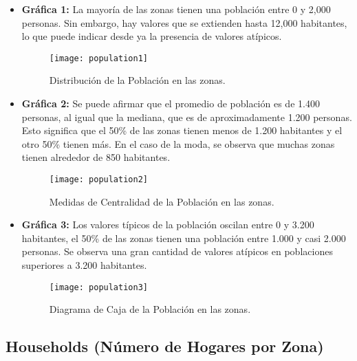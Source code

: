 \documentclass[a4paper, 10pt]{article}
\begin{document}
\begin{itemize}
    \item \textbf{Gráfica 1:} La mayoría de las zonas tienen una población entre 0 y 2,000 personas. Sin embargo, hay valores que se extienden hasta 12,000 habitantes, lo que puede indicar desde ya la presencia de valores atípicos.
    \begin{figure}[H]
        \centering
        \texttt{[image: population1]}
        \caption{Distribución de la Población en las zonas.}
    \end{figure}

    \item \textbf{Gráfica 2:} Se puede afirmar que el promedio de población es de 1.400 personas, al igual que la mediana, que es de aproximadamente 1.200 personas. Esto significa que el 50\% de las zonas tienen menos de 1.200 habitantes y el otro 50\% tienen más. En el caso de la moda, se observa que muchas zonas tienen alrededor de 850 habitantes.
    \begin{figure}[H]
        \centering
        \texttt{[image: population2]}
        \caption{Medidas de Centralidad de la Población en las zonas.}
    \end{figure}

    \item \textbf{Gráfica 3:} Los valores típicos de la población oscilan entre 0 y 3.200 habitantes, el 50\% de las zonas tienen una población entre 1.000 y casi 2.000 personas. Se observa una gran cantidad de valores atípicos en poblaciones superiores a 3.200 habitantes.
    \begin{figure}[H]
        \centering
        \texttt{[image: population3]}
        \caption{Diagrama de Caja de la Población en las zonas.}
    \end{figure}
\end{itemize}

\subsection{Households (Número de Hogares por Zona)}
\end{document}
